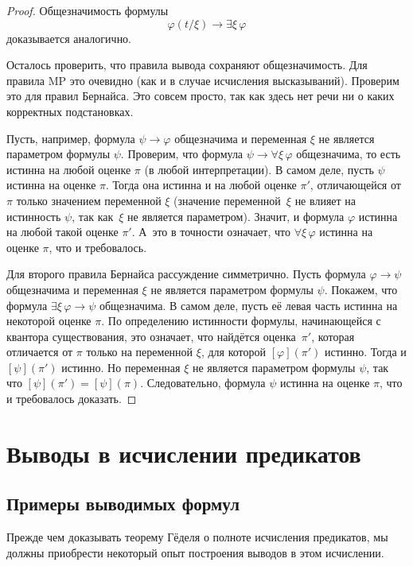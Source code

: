 \begin{proof}
Общезначимость формулы
        $$
\varphi(t/\xi) \to \exists \xi\,\varphi
        $$
доказывается аналогично.

Осталось проверить, что правила вывода сохраняют общезначимость.
Для правила MP это очевидно (как и в случае исчисления высказываний).
Проверим это для правил Бернайса. Это совсем просто, так как здесь
нет речи ни о каких корректных подстановках.

Пусть, например, формула $\psi \to \varphi$ общезначима и
переменная $\xi$ не является параметром формулы $\psi$.
Проверим, что формула $\psi\to\forall\xi\,\varphi$ общезначима,
то есть истинна на любой оценке $\pi$ (в любой интерпретации). В
самом деле, пусть $\psi$ истинна на оценке $\pi$. Тогда она
истинна и на любой оценке $\pi'$, отличающейся от $\pi$ только
значением переменной $\xi$ (значение переменной~$\xi$ не влияет
на истинность $\psi$, так как~$\xi$ не является
параметром). Значит, и формула $\varphi$ истинна на любой такой
оценке $\pi'$. А~это в точности означает, что $\forall
\xi\,\varphi$ истинна на оценке $\pi$, что и требовалось.

Для второго правила Бернайса рассуждение симметрично.
Пусть формула $\varphi\to\psi$ общезначима и
переменная $\xi$ не является параметром формулы $\psi$. Покажем,
что формула $\exists \xi\,\varphi\to\psi$ общезначима. В самом
деле, пусть её левая часть истинна на некоторой оценке $\pi$. По
определению истинности формулы, начинающейся с квантора
существования, это означает, что найдётся оценка~$\pi'$, которая
отличается от $\pi$ только на переменной $\xi$, для которой
$[\varphi](\pi')$ истинно. Тогда и $[\psi](\pi')$ истинно. Но
переменная $\xi$ не является параметром формулы $\psi$, так что
$[\psi](\pi')=[\psi](\pi)$. Следовательно, формула $\psi$
истинна на оценке $\pi$, что и требовалось доказать.
\end{proof}

\section{Выводы в исчислении предикатов}

\subsection*{Примеры выводимых формул}
Прежде чем доказывать теорему Гёделя о полноте
исчисления предикатов, мы должны приобрести некоторый
опыт построения выводов в этом исчислении.

